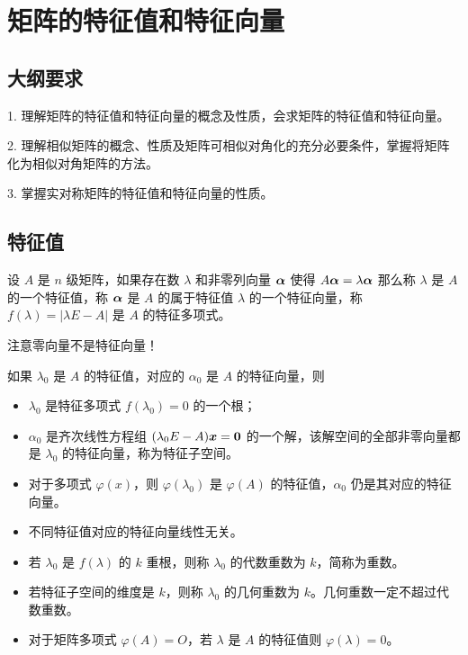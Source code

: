 \section{矩阵的特征值和特征向量}

\subsection{大纲要求}

1. 理解矩阵的特征值和特征向量的概念及性质，会求矩阵的特征值和特征向量。

2. 理解相似矩阵的概念、性质及矩阵可相似对角化的充分必要条件，掌握将矩阵化为相似对角矩阵的方法。

3. 掌握实对称矩阵的特征值和特征向量的性质。

\subsection{特征值}

\begin{definition}
	设 $A$ 是 $n$ 级矩阵，如果存在数 $\lambda$ 和非零列向量 $\boldsymbol{\alpha}$ 使得 $A \boldsymbol{\alpha} = \lambda\boldsymbol{\alpha}$ 那么称 $\lambda$ 是 $A$ 的一个特征值，称 $\boldsymbol{\alpha}$ 是 $A$ 的属于特征值 $\lambda$ 的一个特征向量，称 $f(\lambda) = |\lambda E - A|$ 是 $A$ 的特征多项式。
\end{definition}

\begin{note}
	注意零向量不是特征向量！
\end{note}

如果 $\lambda_0$ 是 $A$ 的特征值，对应的 $\alpha_0$ 是 $A$ 的特征向量，则
\begin{itemize}
	\item $\lambda_0$ 是特征多项式 $f(\lambda_0) = 0$ 的一个根；
	\item $\alpha_0$ 是齐次线性方程组 $(\lambda_0 E - A) \boldsymbol{x} = \boldsymbol{0}$ 的一个解，该解空间的全部非零向量都是 $\lambda_0$ 的特征向量，称为特征子空间。
	\item 对于多项式 $\varphi(x)$，则 $\varphi(\lambda_0)$ 是 $\varphi(A)$ 的特征值，$\alpha_0$ 仍是其对应的特征向量。
	\item 不同特征值对应的特征向量线性无关。
	\item 若 $\lambda_0$ 是 $f(\lambda)$ 的 $k$ 重根，则称 $\lambda_0$ 的代数重数为 $k$，简称为重数。
	\item 若特征子空间的维度是 $k$，则称 $\lambda_0$ 的几何重数为 $k$。几何重数一定不超过代数重数。
	\item 对于矩阵多项式 $\varphi(A) = O$，若 $\lambda$ 是 $A$ 的特征值则 $\varphi(\lambda) = 0$。
\end{itemize}


